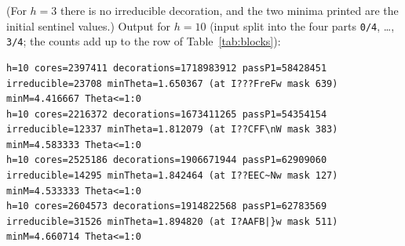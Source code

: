 \documentclass[11pt,a4paper]{article}
\theoremstyle{definition}
\theoremstyle{remark}
\numberwithin{equation}{section}
\begin{document}
(For $h=3$ there is no irreducible decoration, and the two minima printed are the
initial sentinel values.) Output for $h=10$ (input split into the four parts \texttt{0/4}, \dots, \texttt{3/4};
the counts add up to the row of Table~\ref{tab:blocks}):
\begin{lstlisting}
h=10 cores=2397411 decorations=1718983912 passP1=58428451 irreducible=23708 minTheta=1.650367 (at I???FreFw mask 639) minM=4.416667 Theta<=1:0
h=10 cores=2216372 decorations=1673411265 passP1=54354154 irreducible=12337 minTheta=1.812079 (at I??CFF\nW mask 383) minM=4.583333 Theta<=1:0
h=10 cores=2525186 decorations=1906671944 passP1=62909060 irreducible=14295 minTheta=1.842464 (at I??EEC~Nw mask 127) minM=4.533333 Theta<=1:0
h=10 cores=2604573 decorations=1914822568 passP1=62783569 irreducible=31526 minTheta=1.894820 (at I?AAFB|}w mask 511) minM=4.660714 Theta<=1:0
\end{lstlisting}
\end{document}
